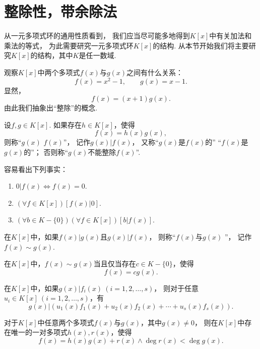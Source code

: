 \section{整除性，带余除法}
从一元多项式环的通用性质看到，
我们应当尽可能多地得到\(K[x]\)中有关加法和乘法的等式，
为此需要研究一元多项式环\(K[x]\)的结构.
从本节开始我们将主要研究\(K[x]\)的结构，其中\(K\)是任一数域.

观察\(K[x]\)中两个多项式\(f(x)\)与\(g(x)\)之间有什么关系：\[
	f(x)=x^2-1, \qquad
	g(x)=x-1.
\]
显然，\[
	f(x)=(x+1) g(x).
\]
由此我们抽象出“整除”的概念.

\begin{definition}
设\(f,g \in K[x]\).
如果存在\(h \in K[x]\)，使得\[
	f(x) = h(x) g(x),
\]
则称“\(g(x)\)  \(f(x)\)”，
记作\(g(x) \vert f(x)\)，
又称“\(g(x)\)是\(f(x)\)的”
“\(f(x)\)是\(g(x)\)的”；
否则称“\(g(x)\)不能整除\(f(x)\)”.
\end{definition}

容易看出下列事实：
\begin{enumerate}
	\item \(0 \vert f(x) \iff f(x) = 0\).
	\item \((\forall f \in K[x])[f(x) \vert 0]\).
	\item \((\forall b \in K - \{0\})(\forall f \in K[x])[b \vert f(x)]\).
\end{enumerate}

\begin{definition}
在\(K[x]\)中，如果\(f(x) \vert g(x)\)且\(g(x) \vert f(x)\)，
则称“\(f(x)\)与\(g(x)\) ”，
记作\(f(x) \sim g(x)\).
\end{definition}

\begin{proposition}
在\(K[x]\)中，\(f(x) \sim g(x)\)当且仅当存在\(c \in K-\{0\}\)，使得\[
	f(x) = c g(x).
\]
\end{proposition}

\begin{proposition}
在\(K[x]\)中，如果\(g(x) \vert f_i(x)\ (i=1,2,\dotsc,s)\)，
则对于任意\(u_i \in K[x]\ (i=1,2,\dotsc,s)\)，有\[
	g(x) \vert (u_1(x) f_1(x) + u_2(x) f_2(x) + \dotsb + u_s(x) f_s(x)).
\]
\end{proposition}

\begin{theorem}\label{theorem:多项式.带余除法}
对于\(K[x]\)中任意两个多项式\(f(x)\)与\(g(x)\)，其中\(g(x)\neq0\)，
则在\(K[x]\)中存在唯一的一对多项式\(h(x),r(x)\)，使得\[
	f(x)=h(x) g(x) + r(x)
	\land
	\deg r(x) < \deg g(x).
\]
\end{theorem}

